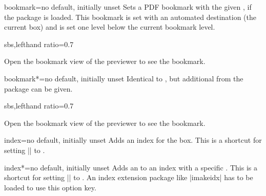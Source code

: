 \begin{docTcbKey}[][doc new=2017-02-10]{bookmark}{=}{no default, initially unset}
  Sets a PDF bookmark with the given , if the package  \cite{oberdiek:bookmark}
  is loaded. This bookmark is set with an automated destination (the current box)
  and is set one level below the current bookmark level.
  \begin{dispExample*}{sbs,lefthand ratio=0.7}
\begin{tcolorbox}[colback=blue!10,colframe=blue!50!black,
  bookmark=Example for using a bookmark,
  title=Example for using a bookmark]
Open the bookmark view of the previewer
to see the bookmark.
\end{tcolorbox}
  \end{dispExample*}
\end{docTcbKey}


\begin{docTcbKey}[][doc new=2017-02-10]{bookmark*}{=}{no default, initially unset}
  Identical to , but additional 
  from the package  \cite{oberdiek:bookmark} can be given.
  \begin{dispExample*}{sbs,lefthand ratio=0.7}
\begin{tcolorbox}[colback=red!10,colframe=red!50!black,
  bookmark*={color=red,italic,bold}%
            {Another bookmark example},
  title=Red and bold bookmark]
Open the bookmark view of the previewer
to see the bookmark.
\end{tcolorbox}
  \end{dispExample*}
\end{docTcbKey}



\begin{docTcbKey}[][doc new=2018-07-26]{index}{=}{no default, initially unset}
  Adds an index  for the box. This is a shortcut for
  setting |\index| to .
\end{docTcbKey}


\begin{docTcbKey}[][doc new=2018-07-26]{index*}{=}{no default, initially unset}
  Adds an  to an index with a specific .
  This is a shortcut for
  setting |\index| to .
  An index extension package like |imakeidx| has to be loaded to use
  this option key.
\end{docTcbKey}








